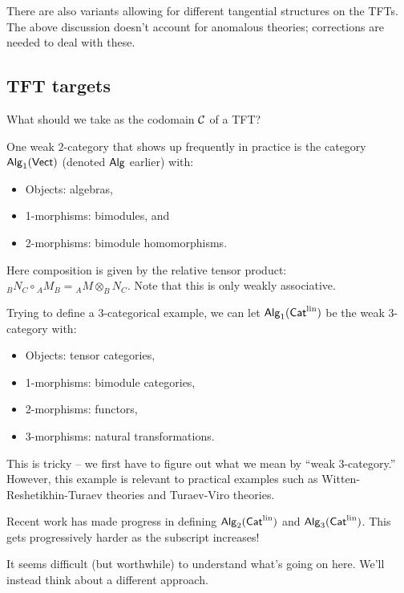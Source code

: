 There are also variants allowing for different tangential structures on the TFTs.
The above discussion doesn't account for anomalous theories; corrections are needed to deal with these.

\subsection{TFT targets}

What should we take as the codomain $\mathcal{C}$ of a TFT?

\begin{ex}
	One weak $2$-category that shows up frequently in practice is the category $\mathsf{Alg}_1(\mathsf{Vect})$ (denoted $\mathsf{Alg}$ earlier) with:
	\begin{itemize}
		\item Objects: algebras,
		\item 1-morphisms: bimodules, and
		\item 2-morphisms: bimodule homomorphisms.
	\end{itemize}
	Here composition is given by the relative tensor product: ${}_B N_C \circ {}_A M_B = {}_A M \otimes_B N_C$.
	Note that this is only weakly associative.
\end{ex}

\begin{ex}
	Trying to define a 3-categorical example, we can let $\mathsf{Alg}_1(\mathsf{Cat}^{\textrm{lin}})$ be the weak 3-category with:
	\begin{itemize}
		\item Objects: tensor categories,
		\item 1-morphisms: bimodule categories,
		\item 2-morphisms: functors,
		\item 3-morphisms: natural transformations.
	\end{itemize}
	This is tricky -- we first have to figure out what we mean by ``weak 3-category.''
	However, this example is relevant to practical examples such as Witten-Reshetikhin-Turaev theories and Turaev-Viro theories.
\end{ex}

\begin{ex}
	Recent work has made progress in defining $\mathsf{Alg}_2(\mathsf{Cat}^{\textrm{lin}})$ and $\mathsf{Alg}_3(\mathsf{Cat}^{\textrm{lin}})$.
	This gets progressively harder as the subscript increases!
\end{ex}

It seems difficult (but worthwhile) to understand what's going on here.
We'll instead think about a different approach.

